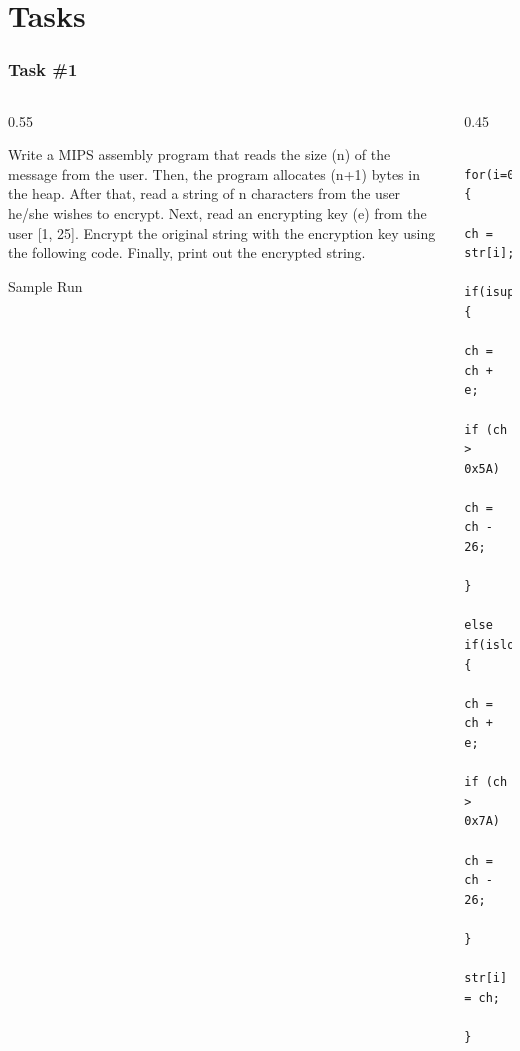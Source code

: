 \documentclass[
	10pt, %
	hmargin=1cm,vmargin=0cm,head=0.5cm,headsep=0pt,foot=0.5cm,margin=2cm
]{beamer}
\begin{document}

\section{Tasks}

\begin{frame}[fragile]
	\frametitle{Task \#1}
	\begin{columns}[c]
		\begin{column}{0.55\textwidth}
		
			\justifying
			Write a MIPS assembly program that reads the size (n) of the message from the user. Then, the program allocates (n+1) bytes in the heap. After that, read a string of n characters from the user he/she wishes to encrypt. Next, read an encrypting key (e) from the user [1, 25]. Encrypt the original string with the encryption key using the following code. Finally, print out the encrypted string.

			\centering
			Sample Run

		\end{column}
		\begin{column}{0.45\textwidth}
		\begin{listing}[H]
			\centering			
			\begin{verbatim}
			for(i=0;i<n;i++){
				ch = str[i];
				if(isupper(ch)){
					ch = ch + e;
					if (ch > 0x5A)
						ch = ch - 26;
					}
				else if(islower(ch)){
					ch = ch + e;
					if (ch > 0x7A)
						ch = ch - 26;
					}
				str[i] = ch;
			}
			\end{verbatim}
			\caption{Caesar Encryption Algorithm}
			\end{listing}
		\end{column}
	\end{columns}
\end{frame}
\end{document}
